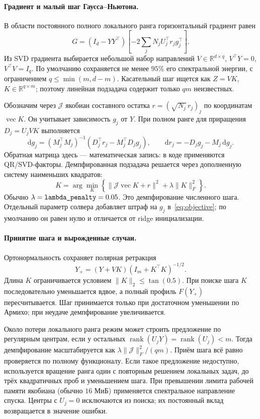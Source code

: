 \documentclass[11pt,a4paper]{article}
\newcommand{\R}{\mathbb R}
\newcommand{\norm}[1]{\lVert#1\rVert}
\newcommand{\code}[1]{\texttt{\detokenize{#1}}}
\begin{document}
\paragraph{Градиент и малый шаг Гаусса--Ньютона.}
В области постоянного полного локального ранга горизонтальный градиент равен
\begin{equation}\label{eq:gradient}
 G=(I_d-YY^\top)\left[-2\sum_jN_j U_j^\top r_jg_j^\top\right].
\end{equation}
Из SVD градиента выбирается небольшой набор направлений
$V\in\R^{d\times q}$, $V^\top Y=0$, $V^\top V=I_q$.
По умолчанию сохраняется не менее $95\%$ его спектральной энергии,
с ограничением $q\le\min(m,d-m)$.
Касательный шаг ищется как $Z=VK$, $K\in\R^{q\times m}$;
поэтому линейная подзадача содержит только $qm$ неизвестных.

Обозначим через $\mathcal J$ якобиан составного остатка
$r=(\sqrt{N_j}\,r_j)_j$ по координатам $\operatorname{vec}K$.
Он учитывает зависимость $g_j$ от $Y$.
При полном ранге для приращения $D_j=U_jVK$ выполняется
\[
 \mathrm dg_j=(M_j^\top M_j)^{-1}
       (D_j^\top r_j-M_j^\top D_jg_j),\qquad
 \mathrm dr_j=-D_jg_j-M_j\,\mathrm dg_j.
\]
Обратная матрица здесь --- математическая запись: в коде применяются
QR/SVD-факторы. Демпфированная подзадача решается через
дополненную систему наименьших квадратов:
\begin{equation}\label{eq:gn}
 K=\arg\min_K\left\{
   \norm{\mathcal J\operatorname{vec}K+r}^2
   +\lambda\norm{K}_F^2\right\}.
\end{equation}
Обычно $\lambda=\code{lambda_penalty}=0.05$.
Это демпфирование численного шага. Отдельный параметр солвера
\code{local_ridge} добавляет штраф на $g_j$ в~\eqref{eq:objective};
по умолчанию он равен нулю и отличается от ridge инициализации.

\paragraph{Принятие шага и вырожденные случаи.}
Ортонормальность сохраняет полярная ретракция
\[
 Y_+=(Y+VK)(I_m+K^\top K)^{-1/2}.
\]
Длина $K$ ограничивается условием $\norm{K}_2\le\tan(0.5)$.
При поиске шага $K$ последовательно уменьшается вдвое,
а полный профиль $F(Y_+)$ пересчитывается.
Шаг принимается только при достаточном уменьшении по Армихо;
при неудаче демпфирование увеличивается.

Около потери локального ранга режим \code{relative_gn=True} может строить
предложение по регулярным центрам, если у остальных
$\operatorname{rank}(U_jY)=\operatorname{rank}(U_j)<m$.
Тогда демпфирование масштабируется как
$\lambda\norm{\mathcal J}_F^2/(qm)$.
Приём шага всё равно проверяется по полному функционалу.
Если такое предложение недоступно, используется вращение ранга один
с повторным решением локальных задач, до трёх квадратичных проб
и уменьшением шага. При превышении лимита рабочей памяти якобиана
(обычно $16$ МиБ) применяется спектральное направление спуска.
Центры с $U_j=0$ исключаются из поиска; их постоянный вклад
возвращается в значение ошибки.
\end{document}
